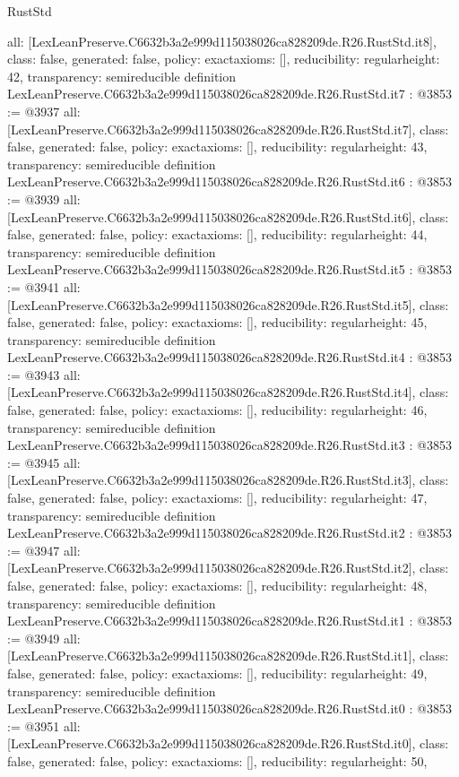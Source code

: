 \begin{lexlean}{RustStd}
\begin{coremodule}
{  all: [LexLeanPreserve.C6632b3a2e999d115038026ca828209de.R26.RustStd.it8],
  class: false,
  generated: false,
  policy: exact{axioms: []},
  reducibility: regular{height: 42},
  transparency: semireducible
}
definition LexLeanPreserve.C6632b3a2e999d115038026ca828209de.R26.RustStd.it7 : @3853 := @3937 {
  all: [LexLeanPreserve.C6632b3a2e999d115038026ca828209de.R26.RustStd.it7],
  class: false,
  generated: false,
  policy: exact{axioms: []},
  reducibility: regular{height: 43},
  transparency: semireducible
}
definition LexLeanPreserve.C6632b3a2e999d115038026ca828209de.R26.RustStd.it6 : @3853 := @3939 {
  all: [LexLeanPreserve.C6632b3a2e999d115038026ca828209de.R26.RustStd.it6],
  class: false,
  generated: false,
  policy: exact{axioms: []},
  reducibility: regular{height: 44},
  transparency: semireducible
}
definition LexLeanPreserve.C6632b3a2e999d115038026ca828209de.R26.RustStd.it5 : @3853 := @3941 {
  all: [LexLeanPreserve.C6632b3a2e999d115038026ca828209de.R26.RustStd.it5],
  class: false,
  generated: false,
  policy: exact{axioms: []},
  reducibility: regular{height: 45},
  transparency: semireducible
}
definition LexLeanPreserve.C6632b3a2e999d115038026ca828209de.R26.RustStd.it4 : @3853 := @3943 {
  all: [LexLeanPreserve.C6632b3a2e999d115038026ca828209de.R26.RustStd.it4],
  class: false,
  generated: false,
  policy: exact{axioms: []},
  reducibility: regular{height: 46},
  transparency: semireducible
}
definition LexLeanPreserve.C6632b3a2e999d115038026ca828209de.R26.RustStd.it3 : @3853 := @3945 {
  all: [LexLeanPreserve.C6632b3a2e999d115038026ca828209de.R26.RustStd.it3],
  class: false,
  generated: false,
  policy: exact{axioms: []},
  reducibility: regular{height: 47},
  transparency: semireducible
}
definition LexLeanPreserve.C6632b3a2e999d115038026ca828209de.R26.RustStd.it2 : @3853 := @3947 {
  all: [LexLeanPreserve.C6632b3a2e999d115038026ca828209de.R26.RustStd.it2],
  class: false,
  generated: false,
  policy: exact{axioms: []},
  reducibility: regular{height: 48},
  transparency: semireducible
}
definition LexLeanPreserve.C6632b3a2e999d115038026ca828209de.R26.RustStd.it1 : @3853 := @3949 {
  all: [LexLeanPreserve.C6632b3a2e999d115038026ca828209de.R26.RustStd.it1],
  class: false,
  generated: false,
  policy: exact{axioms: []},
  reducibility: regular{height: 49},
  transparency: semireducible
}
definition LexLeanPreserve.C6632b3a2e999d115038026ca828209de.R26.RustStd.it0 : @3853 := @3951 {
  all: [LexLeanPreserve.C6632b3a2e999d115038026ca828209de.R26.RustStd.it0],
  class: false,
  generated: false,
  policy: exact{axioms: []},
  reducibility: regular{height: 50},
}
\end{coremodule}
\end{lexlean}
